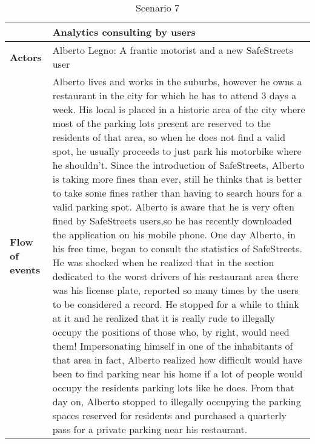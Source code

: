 \begin{table}[!htbp]
	\centering
\begin{tabular}{lp{9.8cm}}
\hline
\bf\large  &\bf\large Analytics consulting by users\\
\hline
\hline

\bf Actors&Alberto Legno: A frantic motorist and a new SafeStreets user\\
\hline
\bf Flow of events&
Alberto lives and works in the suburbs, however he owns a restaurant in the city for which he has to attend 3 days a week.
His local is placed in a historic area of the city where most of the parking lots present are reserved to the residents of that area, so when he does not find a valid spot, he usually proceeds to just park his motorbike where he shouldn't.
Since the introduction of SafeStreets, Alberto is taking more fines than ever, still he thinks that is better to take some fines rather than having to search hours for a valid parking spot.
Alberto is aware that he is very often fined by SafeStreets users,so he has recently downloaded the application on his mobile phone. One day Alberto, in his free time, began to consult the statistics of SafeStreets. He was shocked when he realized that in the section dedicated to the worst drivers of his restaurant area there was his license plate, reported so many times by the users to be considered a record.
He stopped for a while to think at it and he realized that it is really rude to illegally occupy the positions of those who, by right, would need them! Impersonating himself in one of the inhabitants of that area in fact, Alberto realized how difficult would have been to find parking near his home if a lot of people would occupy the residents parking lots like he does.
From that day on, Alberto stopped to illegally occupying the parking spaces reserved for residents and purchased a quarterly pass for a private parking near his restaurant.
\end{tabular}
\caption{Scenario 7} 
\label{tab:scenarioseven}
\end{table}